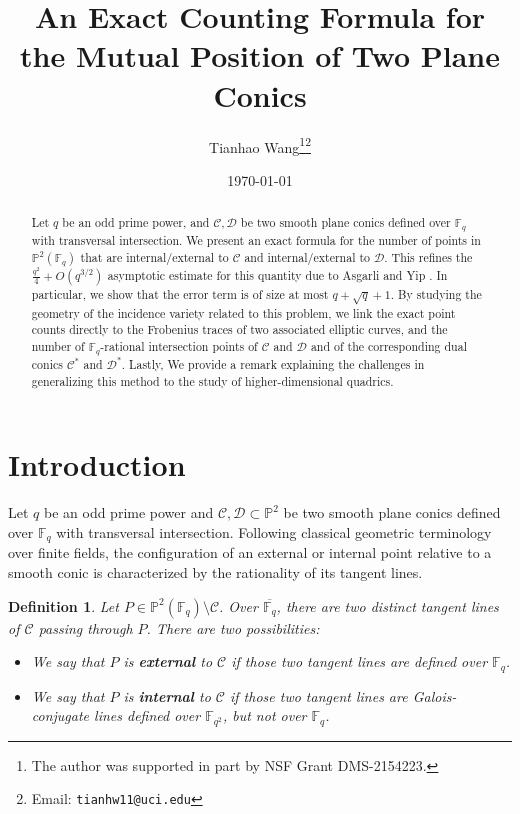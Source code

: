\documentclass[11pt]{article}
\title{An Exact Counting Formula for the Mutual Position of Two Plane Conics}
\author{Tianhao Wang\thanks{The author was supported in part by NSF Grant DMS-2154223.}\thanks{Email: \texttt{tianhw11@uci.edu}}}
\date{\today}
\newtheorem{defn}{Definition}[section]
\theoremstyle{definition}
\theoremstyle{definition}
\begin{document}
\maketitle
\begin{abstract}
Let $q$ be an odd prime power, and $\mathcal{C}, \mathcal{D}$ be two smooth plane conics defined over $\mathbb{F}_q$ with transversal intersection. We present an exact formula for the number of points in $\mathbb{P}^2(\mathbb{F}_q)$ that are internal/external to $\mathcal{C}$ and internal/external to $\mathcal{D}$. This refines the $\frac{q^2}{4}+O(q^{3/2})$ asymptotic estimate for this quantity due to Asgarli and Yip \cite[Theorem 1.2]{Asgarli}.  In particular, we show that the error term is of size at most $q+\sqrt{q} + 1$. By studying the geometry of the incidence variety related to this problem, we link the exact point counts directly to the Frobenius traces of two associated elliptic curves, and the number of $\mathbb{F}_q$-rational intersection points of $\mathcal{C}$ and $\mathcal{D}$ and of the corresponding dual conics $\mathcal{C}^*$ and $\mathcal{D}^*$. Lastly, We provide a remark explaining the challenges in generalizing this method to the study of higher-dimensional quadrics.
\end{abstract}


\section{Introduction}
Let $q$ be an odd prime power and $\mathcal{C}, \mathcal{D} \subset \mathbb{P}^2$ be two smooth plane conics defined over $\mathbb{F}_q$ with transversal intersection. Following classical geometric terminology over finite fields, the configuration of an external or internal point relative to a smooth conic is characterized by the rationality of its tangent lines.

\begin{defn}
Let \(P \in \mathbb P^2(\mathbb F_q)\setminus \mathcal C\). Over $\overline{\mathbb{F}_q}$, there are two distinct tangent lines of $\mathcal{C}$ passing through $P$. There are two possibilities: 
\begin{itemize}
  \item We say that \(P\) is \textbf{external} to \(\mathcal C\) if those two tangent lines are defined over \(\mathbb F_q\).
  \item We say that \(P\) is \textbf{internal} to \(\mathcal C\) if those two tangent lines are Galois-conjugate lines defined over \(\mathbb F_{q^2}\), but not over $\mathbb{F}_q$. 
\end{itemize}
\end{defn}
\end{document}
